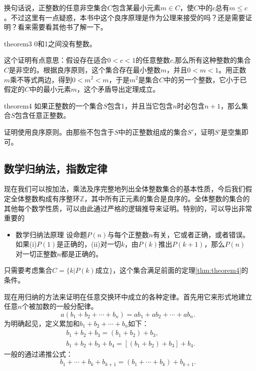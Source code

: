 换句话说，正整数的任意非空集合$C$包含某最小元素$m \in C$，使$C$中的$c$总有$m \le c$。不过这里有一点疑惑，本书中这个良序原理是作为公理来接受的吗？还是需要证明？看来需要看其他书了解一下。

\begin{theorem}{}{theorem3}
0和1之间没有整数。
\end{theorem}

这个证明有点意思：假设存在适合$0<c<1$的任意整数$c$,那么所有这种整数的集合$C$是非空的。根据良序原则，这个集合存在最小整数$m$，并且$0 < m < 1$。用正数$m$乘不等式两边，得到$0 < m^2 < m$，于是$m^2$是集合$C$中的另一个整数，它小于已假定的$C$中的最小元素$m$，这个矛盾导出定理成立。

\begin{theorem}{}{theorem4}
如果正整数的一个集合$S$包含1，并且当它包含$n$时必包含$n+1$，那么集合$S$包含任意正整数。
\end{theorem}

证明使用良序原则。由那些不包含于$S$中的正整数组成的集合$S'$，证明$S'$是空集即可。

\subsection{数学归纳法，指数定律}
现在我们可以按加法，乘法及序完整地列出全体整数集合的基本性质，今后我们假定全体整数构成有序整环$\mathbb{Z}$，其中所有正元素的集合是良序的。全体整数的集合的其他每个数学性质，可以由此通过严格的逻辑推导来证明。特别的，可以导出非常重要的
\begin{itemize}
\item \textcolor{main}{数学归纳法原理} 设命题$P(n)$与每个正整数$n$有关，它或者正确，或者错误。如果(i)$P(1)$是正确的，(ii)对一切$k$，由$P(k)$推出$P(k+1)$，那么$P(n)$对一切正整数$n$都是正确的。
\end{itemize}

只需要考虑集合$C = \{k|P(k)\text{成立}\}$，这个集合满足前面的定理\ref{thm:theorem4}的条件。

现在用归纳的方法来证明在任意交换环中成立的各种定律。首先用它来形式地建立任意$n$个被加数的一般分配律。
\begin{equation}\label{equation0012}
a(b_1+b_2+\cdots+b_n) = ab_1+ab_2+\cdots+ab_n.
\end{equation}
为明确起见，定义累加和$b_1+b_2+\cdots+b_n$如下：
\[
\begin{aligned}
&b_1+b_2+b_3 = (b_1+b_2)+b_3,\\
&b_1+b_2+b_3+b_4 = [(b_1+b_2)+b_3]+b_4.
\end{aligned}
\]
一般的通过递推公式：
\begin{equation}\label{equation0013}
b_1+\cdots+b_k+b_{k+1} = (b_1+\cdots+b_k) + b_{k+1}.
\end{equation}

